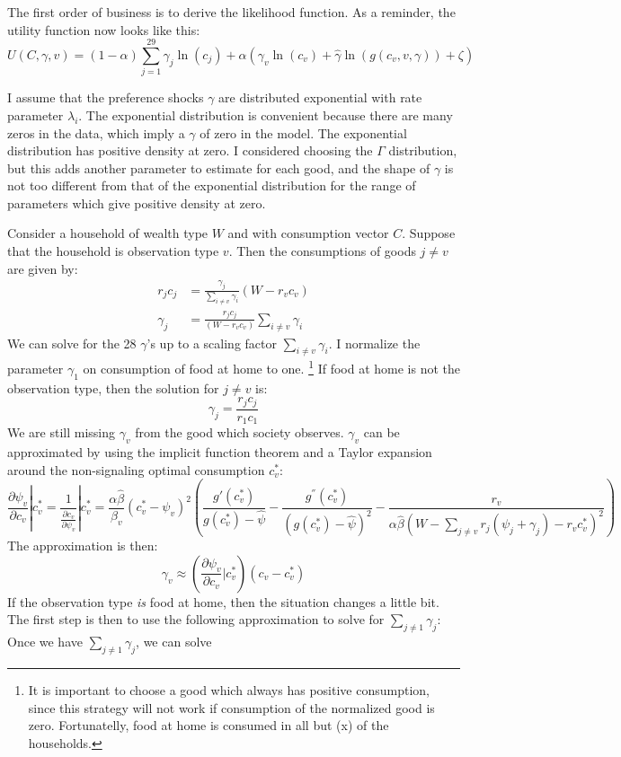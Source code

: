 \documentclass{article}
\begin{document}
The first order of business is to derive the likelihood function.
As a reminder, the utility function now looks like this:
\begin{equation}
	\label{totuti}
U(C,\gamma,v) = (1-\alpha) \sum_{j=1}^{29}\gamma_j \ln(c_j )  + \alpha \left(\gamma_v \ln(c_v)+ \hat{\gamma}\ln(g(c_v,v,\gamma))  + \zeta \right)
\end{equation}

I assume that the preference shocks $\gamma$ are distributed exponential with rate parameter $\lambda_i$. 
The exponential distribution is convenient because there are many zeros in the data, which imply a $\gamma$ of zero in the model.
The exponential distribution has positive density at zero.
I considered choosing the $\Gamma$ distribution, but this adds another parameter to estimate for each good, and the shape of $\gamma$ is not too different from that of the exponential distribution for the range of parameters which give positive density at zero.

Consider a household of wealth type $W$ and with consumption vector $C$.  
Suppose that the household is observation type $v$.
Then the consumptions of goods $j\neq v$ are given by:
\begin{align}
	\label{eq:sgd}
	r_jc_j &= \frac{\gamma_j}{\sum_{i\neq v}\gamma_i}  \left(W-  r_v c_v\right)\\
	\gamma_j &= \frac{r_j c_j}{\left(W- r_v c_v\right)} \sum_{i\neq v}\gamma_i  
\end{align}
We can solve for the 28 $\gamma$'s up to a scaling factor $\sum_{i\neq v}\gamma_i$.
I normalize the parameter $\gamma_1$ on consumption of food at home to one. 
\footnote{It is important to choose a good which always has positive consumption, since this strategy will not work if consumption of the normalized good is zero.  Fortunatelly, food at home is consumed in all but (x) of the households.}
If food at home is not the observation type, then the solution for $j \neq v$ is:
\begin{equation}
	\gamma_j = \frac{r_j c_j}{r_1 c_1}
\end{equation}
We are still missing $\gamma_v$ from the good which society observes.
$\gamma_v$ can be approximated by using the implicit function theorem and a Taylor expansion around the non-signaling optimal consumption $c_v^*$:
\begin{equation}
	\frac{\partial \psi_v}{\partial c_v}|c_v^* = \frac{1}{\frac{\partial c_v}{\partial \psi_v}}|c_v^*=\frac{\alpha \hat{\beta}}{\beta_v}\left(c_v^*-\psi_v\right)^2 \left( \frac{g'(c_v^*)}{g(c_v^*)-\hat{\psi}} - \frac{g^{''}(c_v^*)}{\left(g(c_v^*) -\hat{\psi}\right)^2}-\frac{r_v}{\alpha \hat{\beta}(W-\sum_{j\neq v} r_j (\psi_j + \gamma_j) -r_v c_v^*)^2}\right)
\end{equation}
The approximation is then:
\begin{equation}
	\gamma_v \approx \left(\frac{\partial \psi_v}{\partial c_v}|c_v^*\right)\left(c_v - c_v^*\right)
\end{equation}
If the observation type \emph{is} food at home, then the situation changes a little bit.  
The first step is then to use the following approximation to solve for $\sum_{j\neq 1} \gamma_j$:
Once we have $\sum_{j\neq 1} \gamma_j$, we can solve  
\end{document}

